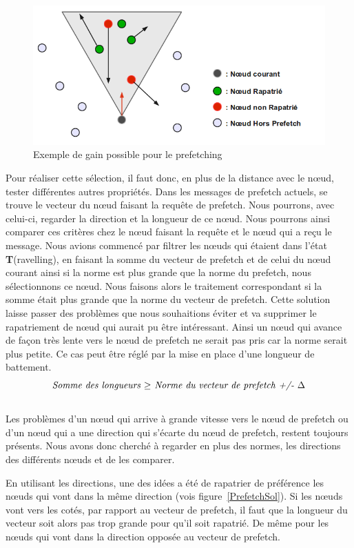 	\begin{figure}[!h]
        \centering
        \includegraphics[scale=0.45]{./Ressources/Images/prefetchaV1.png}
        \caption{Exemple de gain possible pour le prefetching}
        \label{prefetchav}
        \end{figure}

\par Pour réaliser cette sélection, il faut donc, en plus de la distance avec le nœud, tester différentes autres propriétés. Dans les messages de prefetch actuels, se trouve le vecteur du nœud faisant la requête de prefetch. Nous pourrons, avec celui-ci, regarder la direction et la longueur de ce nœud. Nous pourrons ainsi comparer ces critères chez le nœud faisant la requête et le nœud qui a reçu le message. Nous avions commencé par filtrer les nœuds qui étaient dans l'état \textbf{T}(ravelling), en faisant la somme du vecteur de prefetch et de celui du nœud courant ainsi si la norme est plus grande que la norme du prefetch, nous sélectionnons ce nœud. Nous faisons alors le traitement correspondant si la somme était plus grande que la norme du vecteur de prefetch. Cette solution laisse passer des problèmes que nous souhaitions éviter et va supprimer le rapatriement de nœud qui aurait pu être intéressant. Ainsi un nœud qui avance de façon très lente vers le nœud de prefetch ne serait pas pris car la norme serait plus petite. Ce cas peut être réglé par la mise en place d'une longueur de battement.
\newline
$$\\\textit{Somme des longueurs~$\ge$~Norme du vecteur de prefetch +/- $\Delta$}$$
\\Les problèmes d'un nœud qui arrive à grande vitesse vers le nœud de prefetch ou d'un nœud qui a une direction qui s'écarte du nœud de prefetch, restent toujours présents. Nous avons donc cherché à regarder en plus des normes, les directions des différents nœuds et de les comparer.
\par En utilisant les directions, une des idées a été de rapatrier de préférence les nœuds qui vont dans la même direction (vois figure~\ref{PrefetchSol}). Si les nœuds vont vers les cotés, par rapport au vecteur de prefetch, il faut que la longueur du vecteur soit alors pas trop grande pour qu'il soit rapatrié. De même pour les nœuds qui vont dans la direction opposée au vecteur de prefetch.


